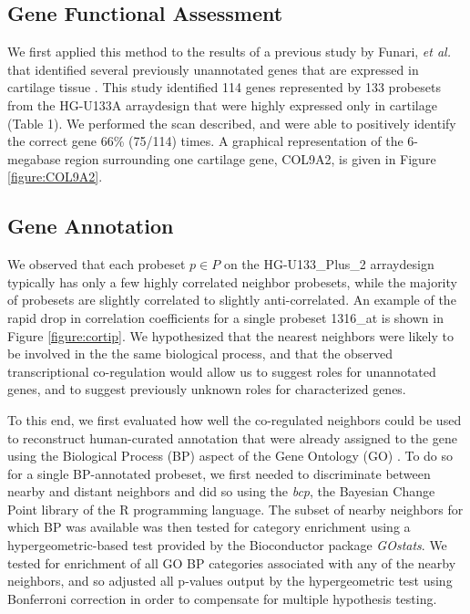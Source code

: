 \documentclass{bioinfo}
\begin{document}


\subsection{Gene Functional Assessment}

We first applied this method to the results of a previous study by Funari,
\emph{et al.} that identified several previously unannotated genes that are
expressed in cartilage tissue \cite{funari}.  This study identified 114 genes
represented by 133 probesets from the HG-U133A arraydesign that were highly
expressed only in cartilage (Table 1).  We performed the scan described, and
were able to positively identify the correct gene 66\% (75/114) times.  A
graphical representation of the 6-megabase region surrounding one cartilage
gene, COL9A2, is given in Figure \ref{figure:COL9A2}.

\subsection{Gene Annotation}\label{Annotation Results}

We observed that each probeset $p \in P$ on the HG-U133\_Plus\_2 arraydesign
typically has only a few highly correlated neighbor probesets, while the
majority of probesets are slightly correlated to slightly anti-correlated.  An
example of the rapid drop in correlation coefficients for a single probeset
1316\_at is shown in Figure \ref{figure:cortip}.  We hypothesized that the
nearest neighbors were likely to be involved in the the same biological
process, and that the observed transcriptional co-regulation would allow us to
suggest roles for unannotated genes, and to suggest previously unknown roles
for characterized genes.

To this end, we first evaluated how well the co-regulated neighbors could be
used to reconstruct human-curated annotation that were already assigned to the
gene using the Biological Process (BP) aspect of the Gene Ontology (GO)
\cite{go}.  To do so for a single BP-annotated probeset, we first needed to
discriminate between nearby and distant neighbors and did so using the
\emph{bcp}, the Bayesian Change Point library of the R programming language.
The subset of nearby neighbors for which BP was available was then tested for
category enrichment using a hypergeometric-based test provided by the
Bioconductor \cite{bioconductor} package \emph{GOstats}.  We tested for
enrichment of all GO BP categories associated with any of the nearby neighbors,
and so adjusted all p-values output by the hypergeometric test using Bonferroni
correction in order to compensate for multiple hypothesis testing.
\end{document}
